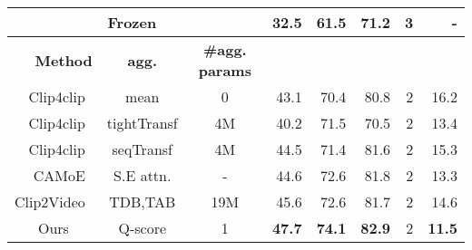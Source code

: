 \begin{table}[t]
\begin{tabular}{@{}rccrrrrr@{}}
 \multicolumn{3}{c}{Frozen~\cite{Bain21}}                                                                                  & 32.5                             & 61.5                             & 71.2                              & 3                                 &     -                             \\ \hline
\textbf{Method}  & \textbf{agg.}        & \textbf{\#agg. params} & &  &  &  &  \\ \midrule
{Clip4clip~\cite{Luo2021CLIP4Clip}}    & mean                 & 0                                                                   & 43.1                             & 70.4                             & 80.8                              & 2                                 & 16.2                             \\
{Clip4clip~\cite{Luo2021CLIP4Clip}}    & tightTransf          & 4M                                                                 & 40.2                             & 71.5                             & 70.5                              & 2                                 & 13.4                             \\
  {Clip4clip~\cite{Luo2021CLIP4Clip}}  & seqTransf            & 4M                                                                 & 44.5                             & 71.4                             & 81.6                              & 2                                 & 15.3                             \\
CAMoE~\cite{cheng2021improving}     & S.E attn.            & -                                                                 & 44.6                             & 72.6                             & 81.8                              & 2                                 & 13.3                             \\
Clip2Video~\cite{fang2021clip2video}   & TDB,TAB          & 19M                                                                & 45.6                             & 72.6                             & 81.7                              & 2                                 & 14.6                             \\ \midrule
\multicolumn{1}{c}{Ours}                     & Q-score              & 1                                     & \textbf{47.7}                    & \textbf{74.1}                    & \textbf{82.9}                     & 2                                 & \textbf{11.5}                    \\ \bottomrule
\end{tabular}
\label{tab:msr-sota}
\end{table}
